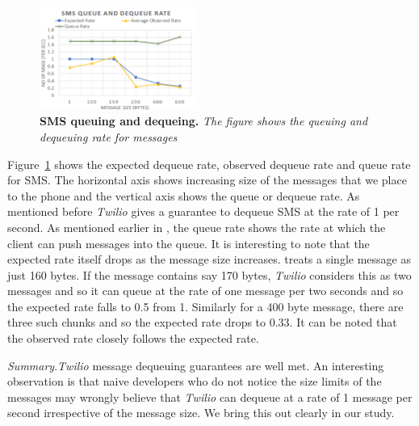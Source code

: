\begin{figure} \centering
\includegraphics[width=0.45\textwidth]{graphs/sms.pdf}
\caption{\textbf{SMS queuing and dequeing.} {\footnotesize\textit{
The figure shows the queuing and dequeuing rate for messages
}}}
\label{fig:sms}
\end{figure}

Figure~\ref{fig:sms} shows the expected dequeue rate, observed dequeue rate and queue rate for SMS. The horizontal axis shows increasing size of the messages that we place to the phone and the vertical axis shows the queue or dequeue rate. As mentioned before \textit{Twilio} gives a guarantee to dequeue SMS at the rate of 1 per second. As mentioned earlier in , the queue rate shows the rate at which the client can push messages into the queue. It is interesting to note that the expected rate itself drops as the message size increases.  treats a single message as just 160 bytes. If the message contains say 170 bytes, \textit{Twilio} considers this as two messages and so it can queue at the rate of one message per two seconds and so the expected rate falls to 0.5 from 1. Similarly for a 400 byte message, there are three such chunks and so the expected rate drops to 0.33. It can be noted that the observed rate closely follows the expected rate. 

\textit{Summary}.\textit{Twilio} message dequeuing guarantees are well met. An interesting observation is that naive developers who do not notice the size limits of the messages may wrongly believe that \textit{Twilio} can dequeue at a rate of 1 message per second irrespective of the message size. We bring this out clearly in our study. 


